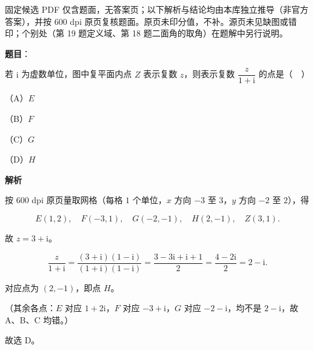 
\begin{gktip}
固定候选 PDF 仅含题面，无答案页；以下解析与结论均由本库独立推导（非官方答案），并按 600 dpi 原页复核题面。原页未印分值，不补。源页未见缺图或错印；个别处（第 19 题定义域、第 18 题二面角的取角）在题解中另行说明。
\end{gktip}

\begin{answer}

\textbf{题目}：

若 $\mathrm i$ 为虚数单位，图中复平面内点 $Z$ 表示复数 $z$，则表示复数 $\dfrac{z}{1+\mathrm i}$ 的点是（　）

（A）$E$

（B）$F$

（C）$G$

（D）$H$
\nopagebreak[4]
\begin{center}\end{center}
\nopagebreak[4]
\textbf{解析}

按 600 dpi 原页量取网格（每格 $1$ 个单位，$x$ 方向 $-3$ 至 $3$，$y$ 方向 $-2$ 至 $2$），得

\nopagebreak[4]
\[E(1,2),\quad F(-3,1),\quad G(-2,-1),\quad H(2,-1),\quad Z(3,1).\]

故 $z=3+\mathrm i$。

\nopagebreak[4]
\[\frac{z}{1+\mathrm i}=\frac{(3+\mathrm i)(1-\mathrm i)}{(1+\mathrm i)(1-\mathrm i)}
=\frac{3-3\mathrm i+\mathrm i+1}{2}=\frac{4-2\mathrm i}{2}=2-\mathrm i.\]

对应点为 $(2,-1)$，即点 $H$。

（其余各点：$E$ 对应 $1+2\mathrm i$，$F$ 对应 $-3+\mathrm i$，$G$ 对应 $-2-\mathrm i$，均不是 $2-\mathrm i$，故 A、B、C 均错。）

故选 D。


\end{answer}
